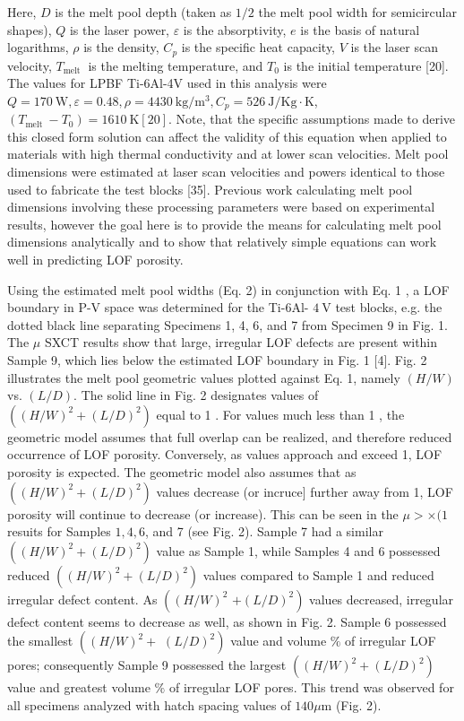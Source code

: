 \documentclass[10pt]{article}
\begin{document}
Here, $D$ is the melt pool depth (taken as $1 / 2$ the melt pool width for semicircular shapes), $Q$ is the laser power, $\varepsilon$ is the absorptivity, $e$ is the basis of natural logarithms, $\rho$ is the density, $C_{p}$ is the specific heat capacity, $V$ is the laser scan velocity, $T_{\text {melt }}$ is the melting temperature, and $T_{0}$ is the initial temperature [20]. The values for LPBF Ti-6Al-4V used in this analysis were $Q=170 \mathrm{~W}, \varepsilon=0.48, \rho=4430 \mathrm{~kg} / \mathrm{m}^{3}, C_{p}=526 \mathrm{~J} / \mathrm{Kg} \cdot \mathrm{K}$, $\left(T_{\text {melt }}-T_{0}\right)=1610 \mathrm{~K}[20]$. Note, that the specific assumptions made to derive this closed form solution can affect the validity of this equation when applied to materials with high thermal conductivity and at lower scan velocities. Melt pool dimensions were estimated at laser scan velocities and powers identical to those used to fabricate the test blocks [35]. Previous work calculating melt pool dimensions involving these processing parameters were based on experimental results, however the goal here is to provide the means for calculating melt pool dimensions analytically and to show that relatively simple equations can work well in predicting LOF porosity.

Using the estimated melt pool widths (Eq. 2) in conjunction with Eq. 1 , a LOF boundary in P-V space was determined for the Ti-6Al- $4 \mathrm{~V}$ test blocks, e.g. the dotted black line separating Specimens 1, 4, 6, and 7 from Specimen 9 in Fig. 1. The $\mu$ SXCT results show that large, irregular LOF defects are present within Sample 9, which lies below the estimated LOF boundary in Fig. 1 [4]. Fig. 2 illustrates the melt pool geometric values plotted against Eq. 1, namely $(H / W)$ vs. $(L / D)$. The solid line in Fig. 2 designates values of $\left((H / W)^{2}+(L / D)^{2}\right)$ equal to 1 . For values much less than 1 , the geometric model assumes that full overlap can be realized, and therefore reduced occurrence of LOF porosity. Conversely, as values approach and exceed 1, LOF porosity is expected. The geometric model also assumes that as $\left((H / W)^{2}+(L / D)^{2}\right)$ values decrease (or incruce] further away from 1, LOF porosity will continue to decrease (or increase). This can be seen in the $\mu>\times(1$ resuits for Samples $1,4,6$, and 7 (see Fig. 2). Sample 7 had a similar $\left((H / W)^{2}+(L / D)^{2}\right)$ value as Sample 1, while Samples 4 and 6 possessed reduced $\left((H / W)^{2}+(L / D)^{2}\right)$ values compared to Sample 1 and reduced irregular defect content. As $\left((H / W)^{2}\right.$ $\left.+(L / D)^{2}\right)$ values decreased, irregular defect content seems to decrease as well, as shown in Fig. 2. Sample 6 possessed the smallest $\left((H / W)^{2}+\right.$ $\left.(L / D)^{2}\right)$ value and volume $\%$ of irregular LOF pores; consequently Sample 9 possessed the largest $\left((H / W)^{2}+(L / D)^{2}\right)$ value and greatest volume $\%$ of irregular LOF pores. This trend was observed for all specimens analyzed with hatch spacing values of $140 \mu \mathrm{m}$ (Fig. 2).
\end{document}
